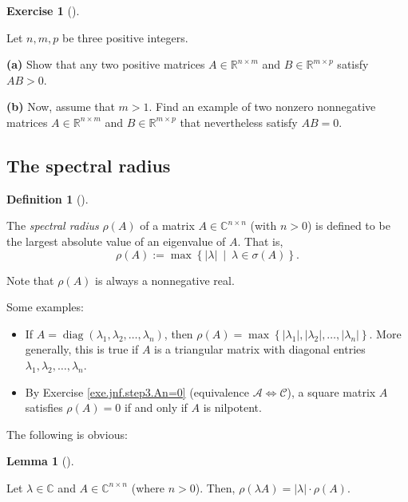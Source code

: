\documentclass[numbers=enddot,12pt,final,onecolumn,notitlepage]{scrartcl}%
\newcounter{exer}
\numberwithin{exer}{subsection}
\theoremstyle{definition}
\newtheorem{lem}[theo]{Lemma}
\newenvironment{lemma}[1][]
{\begin{lem}[#1]\begin{leftbar}}
{\end{leftbar}\end{lem}}
\newtheorem{defi}[theo]{Definition}
\newenvironment{definition}[1][]
{\begin{defi}[#1]\begin{leftbar}}
{\end{leftbar}\end{defi}}
\newtheorem{exmp}[exer]{Exercise}
\newenvironment{exercise}[1][]
{\begin{exmp}[#1]\begin{leftbar}}
{\end{leftbar}\end{exmp}}
\begin{document}
\begin{exercise}
 Let $n,m,p$ be three positive integers. \medskip

\textbf{(a)} Show that any two positive matrices $A\in\mathbb{R}^{n\times m}$
and $B\in\mathbb{R}^{m\times p}$ satisfy $AB>0$. \medskip

\textbf{(b)} Now, assume that $m>1$. Find an example of two nonzero
nonnegative matrices $A\in\mathbb{R}^{n\times m}$ and $B\in\mathbb{R}^{m\times
p}$ that nevertheless satisfy $AB=0$.
\end{exercise}

\subsection{The spectral radius}

\begin{definition}
\label{def.specrad.specrad}The \emph{spectral radius} $\rho\left(  A\right)  $
of a matrix $A\in\mathbb{C}^{n\times n}$ (with $n>0$) is defined to be the
largest absolute value of an eigenvalue of $A$. That is,%
\[
\rho\left(  A\right)  :=\max\left\{  \left\vert \lambda\right\vert
\ \mid\ \lambda\in\sigma\left(  A\right)  \right\}  .
\]


Note that $\rho\left(  A\right)  $ is always a nonnegative real.
\end{definition}

Some examples:

\begin{itemize}
\item If $A=\operatorname*{diag}\left(  \lambda_{1},\lambda_{2},\ldots
,\lambda_{n}\right)  $, then $\rho\left(  A\right)  =\max\left\{  \left\vert
\lambda_{1}\right\vert ,\left\vert \lambda_{2}\right\vert ,\ldots,\left\vert
\lambda_{n}\right\vert \right\}  $. More generally, this is true if $A$ is a
triangular matrix with diagonal entries $\lambda_{1},\lambda_{2}%
,\ldots,\lambda_{n}$.

\item By Exercise \ref{exe.jnf.step3.An=0} (equivalence $\mathcal{A}%
\Longleftrightarrow\mathcal{C}$), a square matrix $A$ satisfies $\rho\left(
A\right)  =0$ if and only if $A$ is nilpotent.
\end{itemize}

The following is obvious:

\begin{lemma}
\label{lem.posmat.specrad.scale}Let $\lambda\in\mathbb{C}$ and $A\in
\mathbb{C}^{n\times n}$ (where $n>0$). Then, $\rho\left(  \lambda A\right)
=\left\vert \lambda\right\vert \cdot\rho\left(  A\right)  $.
\end{lemma}
\end{document}
